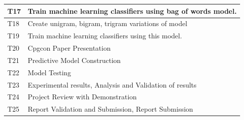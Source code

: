 \documentclass[oneside,a4paper,12pt]{pictreport}
\begin{document}
\begin{table}[]
\begin{tabular}{|l|l|}
T17                  & Train machine learning classifiers using bag of words model.\\ \hline
T18                  & Create unigram, bigram, trigram variations of model \\ \hline
T19                  & Train machine learning classifiers using this model.
 \\ \hline
T20                  & Cpgcon Paper Presentation
 \\ \hline
T21                  & Predictive Model Construction \\ \hline
T22                  & Model Testing \\ \hline
T23                  & Experimental results, Analysis and Validation of results \\ \hline
T24                  &Project Review with Demonstration
 \\ \hline
T25                  &Report Validation and Submission, Report Submission
 \\ \hline
\end{tabular}
\end{table}
\end{document}
